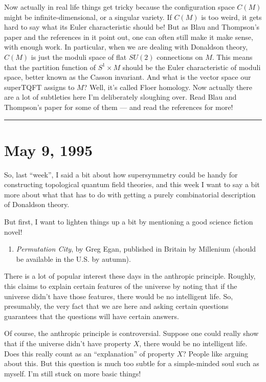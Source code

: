 \documentclass{article}
\def\tightlist{}
\begin{document}
Now actually in real life things get tricky because the configuration
space \(C(M)\) might be infinite-dimensional, or a singular variety. If
\(C(M)\) is too weird, it gets hard to say what its Euler characteristic
should be! But as Blau and Thompson's paper and the references in it
point out, one can often still make it make sense, with enough work. In
particular, when we are dealing with Donaldson theory, \(C(M)\) is just
the moduli space of flat \(SU(2)\) connections on \(M\). This means that
the partition function of \(S^1\times M\) should be the Euler
characteristic of moduli space, better known as the Casson invariant.
And what is the vector space our superTQFT assigns to \(M\)? Well, it's
called Floer homology. Now actually there are a lot of subtleties here
I'm deliberately sloughing over. Read Blau and Thompson's paper for some
of them --- and read the references for more!

\begin{center}\rule{0.5\linewidth}{0.5pt}\end{center}
\hypertarget{week52}{%
\section{May 9, 1995}\label{week52}}

So, last ``week'', I said a bit about how supersymmetry could be handy
for constructing topological quantum field theories, and this week I
want to say a bit more about what that has to do with getting a purely
combinatorial description of Donaldson theory.

But first, I want to lighten things up a bit by mentioning a good
science fiction novel!

\begin{enumerate}
\def\labelenumi{\arabic{enumi})}
\tightlist
\item
  \emph{Permutation City}, by Greg Egan, published in Britain by
  Millenium (should be available in the U.S. by autumn).
\end{enumerate}

There is a lot of popular interest these days in the anthropic
principle. Roughly, this claims to explain certain features of the
universe by noting that if the universe didn't have those features,
there would be no intelligent life. So, presumably, the very fact that
we are here and asking certain questions guarantees that the questions
will have certain answers.

Of course, the anthropic principle is controversial. Suppose one could
really show that if the universe didn't have property \(X\), there would
be no intelligent life. Does this really count as an ``explanation'' of
property \(X\)? People like arguing about this. But this question is
much too subtle for a simple-minded soul such as myself. I'm still stuck
on more basic things!
\end{document}
